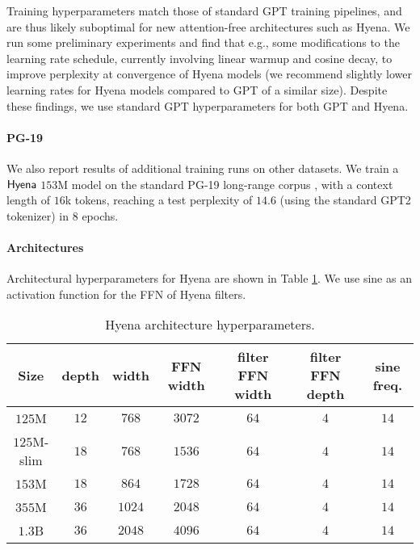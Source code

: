 Training hyperparameters match those of standard GPT training pipelines, and are thus likely suboptimal for new attention-free architectures such as {\sf Hyena}. We run some preliminary experiments and find that e.g., some modifications to the learning rate schedule, currently involving linear warmup and cosine decay, to improve perplexity at convergence of {\sf Hyena} models (we recommend slightly lower learning rates for Hyena models compared to GPT of a similar size). Despite these findings, we use standard GPT hyperparameters for both GPT and {\sf Hyena}.
%
\paragraph{PG-19}

We also report results of additional training runs on other datasets. We train a ${\sf Hyena}$ $153$M model on the standard PG-19 long-range corpus \citep{raecompressive2019}, with a context length of $16$k tokens, reaching a test perplexity of $14.6$ (using the standard GPT2 tokenizer) in $8$ epochs.
%
\paragraph{Architectures}
%
Architectural hyperparameters for {\sf Hyena} are shown in Table \ref{hyena_arch}. We use sine as an activation function for the {\sf FFN} of {\sf Hyena} filters. 

\begin{table}[!bh]
\small
\centering
\caption{{\sf Hyena} architecture hyperparameters.}
\label{hyena_arch}
\setlength{\tabcolsep}{4pt}
\begin{tabular}{@{}c|cccccc@{}}
\toprule
Size & depth & width & {\sf FFN} width & filter {\sf FFN} width & filter {\sf FFN} depth & sine freq. \\
\midrule 
$125$M & $12$ & $768$ & $3072$ & $64$ & $4$ & $14$ \\ 
$125$M-slim &$18$ & $768$ & $1536$ & $64$ & $4$ & $14$\\ 
$153$M & $18$ & $864$ & $1728$ & $64$  & $4$ & $14$\\  
$355$M & $36$ & $1024$ & $2048$ & $64$ & $4$ & $14$ \\ 
$1.3$B & $36$ & $2048$ & $4096$ & $64$ & $4$ & $14$ \\ 
\bottomrule
\end{tabular}
\end{table}


